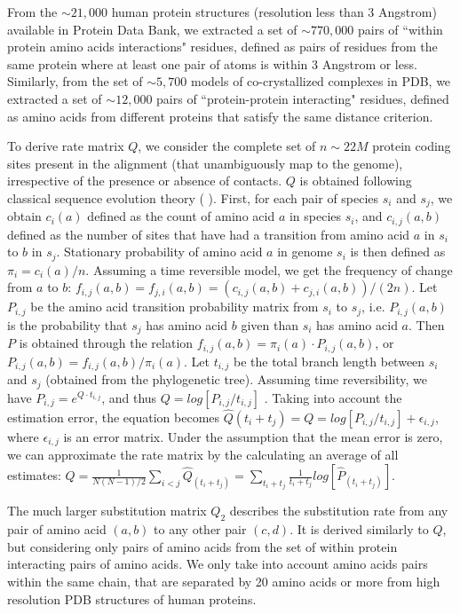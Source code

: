 From the $\sim21,000$ human protein structures (resolution less than 3 Angstrom) available in Protein Data Bank, we extracted a set of $\sim770,000$ pairs of “within protein amino acids interactions" residues, defined as pairs of residues from the same protein where at least one pair of atoms is within 3 Angstrom or less. Similarly, from the set of $\sim5,700$ models of co-crystallized complexes in PDB, we extracted a set of $\sim12,000$ pairs of “protein-protein interacting" residues, defined as amino acids from different proteins that satisfy the same distance criterion.

To derive rate matrix $Q$, we consider the complete set of $n \sim22M$ protein coding sites present in the alignment (that unambiguously map to the genome), irrespective of the presence or absence of contacts. $Q$ is obtained following classical sequence evolution theory (\cite{yang2006computational} \cite{felsenstein2004inferring}). First, for each pair of species  $s_i$ and $s_j$, we obtain $c_i(a)$ defined as the count of amino acid $a$ in species $s_i$, and $c_{i,j}(a,b)$ defined as the number of sites that have had a transition from amino acid $a$ in $s_i$ to $b$ in $s_j$. Stationary probability of amino acid $a$ in genome $s_i$ is then defined as $\pi_i = c_i(a)/n$. Assuming a time reversible model, we get the frequency of change from $a$ to $b$: $f_{i,j}(a,b) = f_{j,i}(a,b) = (c_{i,j}(a,b) + c_{j,i}(a,b))/(2n)$. Let $P_{i,j}$ be the amino acid transition probability matrix from $s_i$ to $s_j$, i.e. $P_{i,j}(a,b)$ is the probability that $s_j$ has amino acid $b$ given than $s_i$ has amino acid $a$. Then $P$ is obtained through the relation $f_{i,j}(a,b) = \pi_i(a) \cdot P_{i,j}(a,b)$, or $P_{i,j}(a,b) =   f_{i,j}(a,b) /  \pi_i(a)$.  Let $t_{i,j}$ be the total branch length between $s_i$ and $s_j$ (obtained from the phylogenetic tree). Assuming time reversibility, we have $P_{i,j} = e^{Q \cdot t_{i,j}}$, and thus $Q=log[ P_{i,j} / t_{i,j} ]$ \cite{yang2006computational}. Taking into account the estimation error, the equation becomes $\hat{Q}(t_i+t_j) = Q = log[ P_{i,j} / t_{i,j} ] + \epsilon_{i,j}$, where $\epsilon_{i,j}$ is an error matrix. Under the assumption that the mean error is zero, we can approximate the rate matrix by the calculating an average of all estimates: $\hat{Q} = \frac{1}{N(N-1)/2} \sum_{i < j} \hat{Q}_(t_i+t_j) = \sum_{t_i+t_j} \frac{1}{t_i+t_j} log[ \hat{P}_(t_i+t_j) ]$.

The much larger substitution matrix $Q_2$ describes the substitution rate from any pair of amino acid $(a,b)$ to any other pair $(c,d)$. It is derived similarly to $Q$, but considering only pairs of amino acids from the set of within protein interacting pairs of amino acids. We only take into account amino acids pairs within the same chain, that are separated by 20 amino acids or more from high resolution PDB structures of human proteins. 

